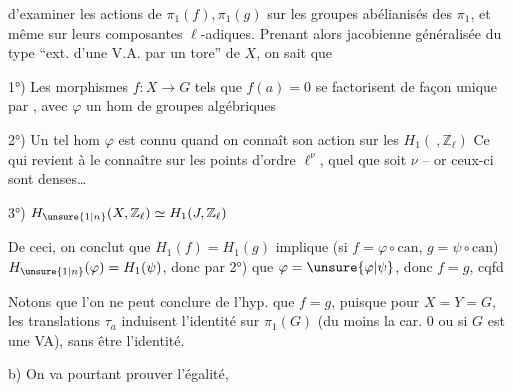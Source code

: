 d'examiner les actions de $\pi_1(f),\pi_1(g)$ sur les groupes abélianisés des $\pi_1$, et même sur leurs composantes $\ell$-adiques. Prenant alors jacobienne généralisée du type ``ext. d'une V.A. par un tore'' de $X$, on sait que

1°) Les morphismes $f:X\longrightarrow G$ tels que $f(a)=0$ se factorisent de façon unique par
,
avec $\varphi$ un hom de groupes algébriques

2°)  Un tel hom $\varphi$ est connu quand on connaît son action sur les $H_1(\ ,\mathbb Z_\ell)$ Ce qui revient à le connaître sur les points d'ordre $\ell^\nu$, quel que soit $\nu$ -- or ceux-ci sont denses\ldots

3°) $H_{\unsure{1|n}}(X,\mathbb Z_\ell)\simeq H_1(J,\mathbb Z_\ell)$

De ceci,  on conclut  que $H_1(f)=H_1(g)$ implique (si $f=\varphi\circ\mathrm{can}$, $g=\psi\circ\mathrm{can}$) $H_{\unsure{1|n}}(\varphi)=H_1(\psi)$, donc par 2°) que $\varphi=\unsure{\varphi|\psi}$, donc $f=g$, cqfd

 Notons que l'on ne peut conclure de l'hyp.  que $f=g$, puisque pour $X=Y=G$, les translations $\tau_a$ induisent l'identité sur $\pi_1(G)$ (du moins  la car. $0$ ou si $G$ est une VA), sans être l'identité.

b) On va pourtant prouver l'égalité,
